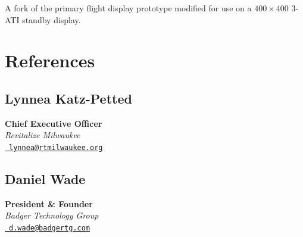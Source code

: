 \documentclass[10pt]{article}
\newcommand{\firstpar}{\vspace{4pt}\noindent}
\begin{document}
\firstpar
A fork of the primary flight display prototype modified for use on a $400\!\times\!400$ 3-ATI
standby display.

\section*{References}
\begin{multicols}{2}
    \raggedcolumns

    \subsection*{Lynnea Katz-Petted}
    \textbf{Chief Executive Officer} \\
    \textit{Revitalize Milwaukee} \\
    \href{mailto:lynnea@rtmilwaukee.org}{\faEnvelope\ \texttt{lynnea@rtmilwaukee.org}}

    \subsection*{Daniel Wade}
    \textbf{President \& Founder} \\
    \textit{Badger Technology Group} \\
    \href{mailto:d.wade@badgertg.com}{\faEnvelope\ \texttt{d.wade@badgertg.com}}
\end{multicols}
\end{document}
